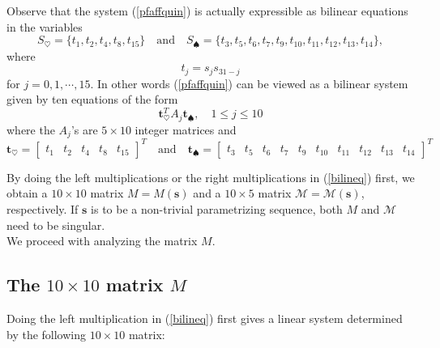 \documentclass[letterpaper,10pt]{amsart}
\newcommand{\Bs}{{\mathbf{s}}}
\newcommand{\Bt}{{\mathbf{t}}}
\newcommand{\M}{{\mathcal{M}}}
\theoremstyle{definition}
\numberwithin{equation}{section}
\begin{document}
Observe that the system (\ref{pfaffquin}) is actually expressible as bilinear equations in the variables
\[S_\heartsuit = \{t_1, t_2, t_4, t_8, t_{15}\} \quad \text{and} \quad S_\spadesuit = \{t_3, t_5, t_6, t_7, t_9, t_{10}, t_{11}, t_{12}, t_{13}, t_{14}\},\]
where 
\begin{equation} \label{tvar} t_j = s_j s_{31 - j}\end{equation}
for $j = 0,1, \cdots, 15$. In other words (\ref{pfaffquin}) can be viewed as a bilinear system given by ten equations of the form 
\begin{equation} \label{bilineq} \Bt_\heartsuit^T A_j \Bt_\spadesuit, \quad 1 \leq j \leq 10\end{equation} 
where the $A_j$'s are $5 \times 10$ integer matrices and 
\begin{equation} \label{tsuit} \Bt_\heartsuit = \begin{bmatrix} t_1  &  t_2 &  t_4  &  t_8 & t_{15}  \end{bmatrix}^T \quad \text{and} \quad \Bt_\spadesuit = \begin{bmatrix} t_3 & t_5  & t_6  & t_7  & t_9  & t_{10}  & t_{11}  & t_{12}  & t_{13}  & t_{14}  \end{bmatrix} ^T \end{equation}

By doing the left multiplications or the right multiplications in (\ref{bilineq}) first, we obtain a $10 \times 10$ matrix $M = M(\Bs)$ and a $10 \times 5$ matrix $\M = \M(\Bs)$, respectively. If $\Bs$ is to be a non-trivial parametrizing sequence, both $M$ and $\M$ need to be singular. \\

We proceed with analyzing the matrix $M$. 

\subsection{The $10 \times 10$ matrix $M$} 

Doing the left multiplication in (\ref{bilineq}) first gives a linear system determined by the following $10 \times 10$ matrix:
\end{document}
